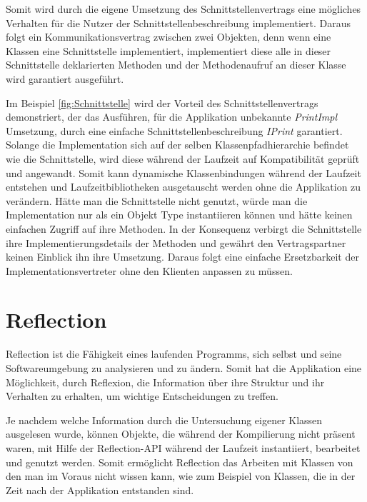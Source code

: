   Somit wird durch die eigene Umsetzung des Schnittstellenvertrags eine mögliches Verhalten für die Nutzer der Schnittstellenbeschreibung implementiert. Daraus folgt ein Kommunikationsvertrag zwischen zwei Objekten, denn wenn eine Klassen eine Schnittstelle implementiert, implementiert diese alle in dieser Schnittstelle deklarierten Methoden und der Methodenaufruf an dieser Klasse wird garantiert ausgeführt.\bigbreak 
  
  Im Beispiel \ref{fig:Schnittstelle} wird der Vorteil des Schnittstellenvertrags demonstriert, der das Ausführen, für die Applikation unbekannte \textit{PrintImpl} Umsetzung, durch eine einfache Schnittstellenbeschreibung \textit{IPrint} garantiert. Solange die Implementation sich auf der selben Klassenpfadhierarchie befindet wie die Schnittstelle, wird diese während der Laufzeit auf Kompatibilität geprüft und angewandt. Somit kann dynamische Klassenbindungen während der Laufzeit entstehen und Laufzeitbibliotheken ausgetauscht werden ohne die Applikation zu verändern. Hätte man die Schnittstelle nicht genutzt, würde man die Implementation nur als ein Objekt Type instantiieren können und hätte keinen einfachen Zugriff auf ihre Methoden. In der Konsequenz verbirgt die Schnittstelle ihre Implementierungsdetails der Methoden und gewährt den Vertragspartner keinen Einblick ihn ihre Umsetzung. Daraus folgt eine einfache Ersetzbarkeit der Implementationsvertreter ohne den Klienten anpassen zu müssen.  

\section{Reflection}\label{sec:reflaction}
  Reflection ist die Fähigkeit eines laufenden Programms, sich selbst und seine Softwareumgebung zu analysieren und zu ändern. 
  Somit hat die Applikation eine Möglichkeit, durch Reflexion, die Information über ihre Struktur und ihr Verhalten zu erhalten, um wichtige Entscheidungen zu treffen.

  Je nachdem welche Information durch die Untersuchung eigener Klassen ausgelesen wurde, können Objekte, die während der Kompilierung nicht präsent waren, mit Hilfe der Reflection-API während der Laufzeit instantiiert, bearbeitet und genutzt werden. Somit ermöglicht Reflection das Arbeiten mit Klassen von den man im Voraus nicht wissen kann, wie zum Beispiel von Klassen, die in der Zeit nach der Applikation entstanden sind.\bigbreak 

